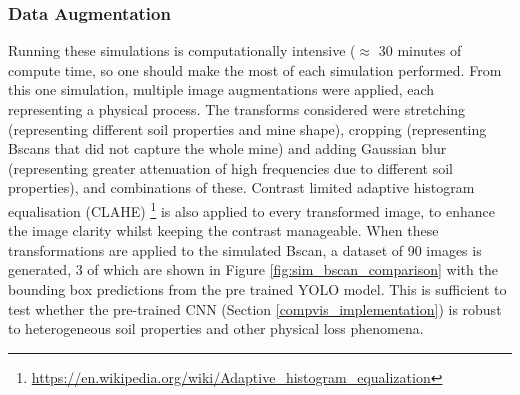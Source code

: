     
    \subsubsection{Data Augmentation}
    
      Running these simulations is computationally intensive (\(\approx\) 30 minutes of compute time, so one should make the most of each simulation performed. From this one simulation, multiple image augmentations were applied, each representing a physical process. The transforms considered were stretching (representing different soil properties and mine shape), cropping (representing Bscans that did not capture the whole mine) and adding Gaussian blur (representing greater attenuation of high frequencies due to different soil properties), and combinations of these. Contrast limited adaptive histogram equalisation (CLAHE) \footnote{\url{https://en.wikipedia.org/wiki/Adaptive_histogram_equalization}} is also applied to every transformed image, to enhance the image clarity whilst keeping the contrast manageable. When these transformations are applied to the simulated Bscan, a dataset of 90 images is generated, 3 of which are shown in Figure \ref{fig:sim_bscan_comparison} with the bounding box predictions from the pre trained YOLO model. This is sufficient to test whether the pre-trained CNN (Section \ref{compvis_implementation}) is robust to heterogeneous soil properties and other physical loss phenomena.

